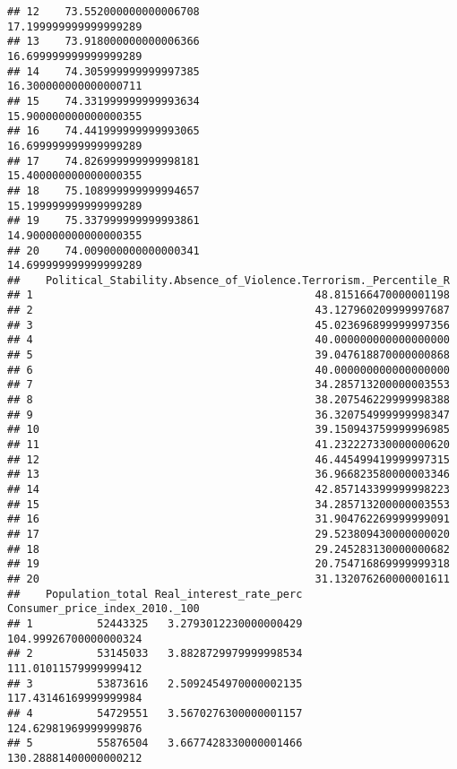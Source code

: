 \documentclass[
]{article}
\begin{document}
\begin{verbatim}
## 12    73.552000000000006708                        17.199999999999999289
## 13    73.918000000000006366                        16.699999999999999289
## 14    74.305999999999997385                        16.300000000000000711
## 15    74.331999999999993634                        15.900000000000000355
## 16    74.441999999999993065                        16.699999999999999289
## 17    74.826999999999998181                        15.400000000000000355
## 18    75.108999999999994657                        15.199999999999999289
## 19    75.337999999999993861                        14.900000000000000355
## 20    74.009000000000000341                        14.699999999999999289
##    Political_Stability.Absence_of_Violence.Terrorism._Percentile_R
## 1                                            48.815166470000001198
## 2                                            43.127960209999997687
## 3                                            45.023696899999997356
## 4                                            40.000000000000000000
## 5                                            39.047618870000000868
## 6                                            40.000000000000000000
## 7                                            34.285713200000003553
## 8                                            38.207546229999998388
## 9                                            36.320754999999998347
## 10                                           39.150943759999996985
## 11                                           41.232227330000000620
## 12                                           46.445499419999997315
## 13                                           36.966823580000003346
## 14                                           42.857143399999998223
## 15                                           34.285713200000003553
## 16                                           31.904762269999999091
## 17                                           29.523809430000000020
## 18                                           29.245283130000000682
## 19                                           20.754716869999999318
## 20                                           31.132076260000001611
##    Population_total Real_interest_rate_perc Consumer_price_index_2010._100
## 1          52443325   3.2793012230000000429          104.99926700000000324
## 2          53145033   3.8828729979999998534          111.01011579999999412
## 3          53873616   2.5092454970000002135          117.43146169999999984
## 4          54729551   3.5670276300000001157          124.62981969999999876
## 5          55876504   3.6677428330000001466          130.28881400000000212

\end{verbatim}
\end{document}
